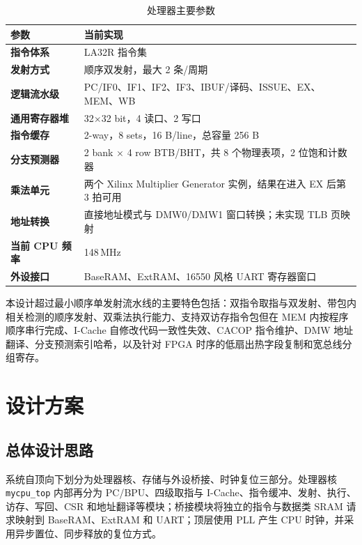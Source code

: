 \documentclass[UTF8,a4paper,zihao=5,fontset=none]{ctexart}
\newcommand{\code}[1]{\nolinkurl{#1}}
\begin{document}
\begin{table}[H]
  \centering
  \caption{处理器主要参数}
  \begin{tabularx}{\textwidth}{>{\bfseries}p{3.4cm} X}
    \toprule
    参数        & 当前实现                                                \\
    \midrule
    指令体系      & LA32R 指令集                                           \\
    发射方式      & 顺序双发射，最大 2 条/周期                                     \\
    逻辑流水级     & PC/IF0、IF1、IF2、IF3、IBUF/译码、ISSUE、EX、MEM、WB          \\
    通用寄存器堆    & 32$\times$32 bit，4 读口、2 写口                          \\
    指令缓存      & 2-way，8 sets，16 B/line，总容量 256 B                    \\
    分支预测器     & 2 bank $\times$ 4 row BTB/BHT，共 8 个物理表项，2 位饱和计数器    \\
    乘法单元      & 两个 Xilinx Multiplier Generator 实例，结果在进入 EX 后第 3 拍可用 \\
    地址转换      & 直接地址模式与 DMW0/DMW1 窗口转换；未实现 TLB 页映射                  \\
    当前 CPU 频率 & 148\,MHz                                            \\
    外设接口      & BaseRAM、ExtRAM、16550 风格 UART 寄存器窗口                  \\
    \bottomrule
  \end{tabularx}
\end{table}

本设计超过最小顺序单发射流水线的主要特色包括：双指令取指与双发射、带包内相关检测的顺序发射、双乘法执行能力、支持双访存指令包但在 MEM 内按程序顺序串行完成、I-Cache 自修改代码一致性失效、CACOP 指令维护、DMW 地址翻译、分支预测索引哈希，以及针对 FPGA 时序的低扇出热字段复制和宽总线分组寄存。

\section{设计方案}

\subsection{总体设计思路}

系统自顶向下划分为处理器核、存储与外设桥接、时钟复位三部分。处理器核 \code{mycpu_top} 内部再分为 PC/BPU、四级取指与 I-Cache、指令缓冲、发射、执行、访存、写回、CSR 和地址翻译等模块；桥接模块将独立的指令与数据类 SRAM 请求映射到 BaseRAM、ExtRAM 和 UART；顶层使用 PLL 产生 CPU 时钟，并采用异步置位、同步释放的复位方式。
\end{document}
